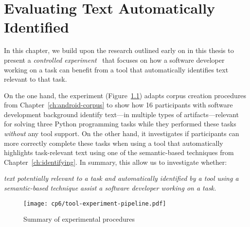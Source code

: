 \setcounter{chapter}{5}
\setcounter{rq}{1}


\chapter{Evaluating Text Automatically Identified}
\label{ch:assisting}




In this chapter, we build upon the research outlined  early on in this thesis to
present a \textit{controlled experiment}~\cite{Lazar2017-cp2} that focuses on how  a
software developer working on a task can benefit from a tool that automatically identifies text 
relevant to that task.



On the one hand, 
the experiment (Figure~\ref{fig:tool-experiment-procedures})
adapts corpus creation procedures from Chapter~\ref{ch:android-corpus}
to show how 16 participants with software development background identify 
text---in multiple types of artifacts---relevant for solving three Python programming tasks while they performed these tasks \textit{without} any tool support. 
On the other hand, 
it investigates if participants can more correctly complete these tasks 
when using a tool 
that  automatically highlights 
task-relevant text using one of the semantic-based techniques 
from Chapter~\ref{ch:identifying}. 
In summary, this allow us to investigate whether:

\medskip
\begin{bluequote}
    \textit{text potentially relevant to a task and automatically identified  by a tool using a semantic-based technique assist a software developer working on a task.}
\end{bluequote}



\begin{figure}
    \centering
    \texttt{[image: cp6/tool-experiment-pipeline.pdf]}
    \caption{Summary of experimental procedures}
    \label{fig:tool-experiment-procedures}
\end{figure}







